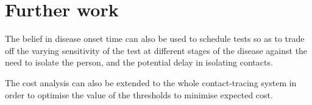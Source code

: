 \documentclass{article}
\begin{document}
\section{Further work}

The belief in disease onset time can also be used to schedule tests so as to trade off the varying sensitivity of the test at different stages of the disease against the need to isolate the person, and the potential delay in isolating contacts.

The cost analysis can also be extended to the whole contact-tracing system in order to optimise the value of the thresholds to minimise expected cost.

%

%
%
% 
%

\end{document}
